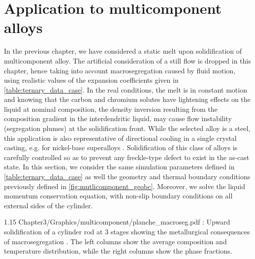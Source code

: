\section{Application to multicomponent alloys}
In the previous chapter, we have considered a static melt upon solidification of multicomponent alloy. 
The artificial consideration of a still flow is dropped in this chapter, hence taking into account macrosegregation 
caused by fluid motion, using realistic values of the expansion coefficients given in \cref{table:ternary_data_case}.
In the real conditions, the melt is in constant motion and knowing that the carbon and chromium solutes have lightening effects on the liquid 
at nominal composition, the density inversion resulting from the composition gradient in the interdendritic 
liquid, may cause flow instability (segregation plumes) at the solidification front. While the selected alloy 
is a steel, this application is also representative of directional cooling in a single crystal casting, e.g. 
for nickel-base superalloys \citep{beckermann_development_2000}. Solidification of this class of alloys is carefully
controlled so as to prevent any freckle-type defect to exist in the as-cast state.
In this section, we consider the same simulation parameters defined in \cref{table:ternary_data_case} as well the geometry and thermal boundary conditions
previously defined in \cref{fig:mutlicomponent_geobc}. Moreover, we solve the liquid momentum conservation equation, with non-slip boundary conditions
on all external sides of the cylinder.
%
\begin{landscape}
\begin{figureth}
{1.15}
{Chapter3/Graphics/multicomponent/planche_macroseg.pdf}
{: Upward solidification of a cylinder rod  at 3 stages showing the metallurgical consequences 
of macrosegregation . The left columns show the average 
composition and temperature distribution, while the right columns show the phase fractions.}
\label{fig:planche_withmacroseg}
\end{figureth}
\end{landscape}
%
